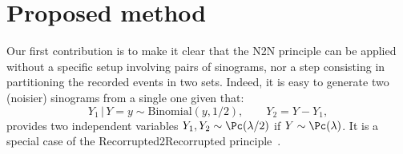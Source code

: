 \documentclass{IEEEtran}
\def\sym{^\text{sym}}
\def\ImDom{_\text{I}}
\def\CountDom{_\text{C}}
\def\CI{_\text{CI}}
\def\CountDomMC{_{\text{C-MC}}}
\def\ImDomMC{_{\text{I-MC}}}
\newcommand{\JI}[1]{{\color{darkgreen}{#1}}\xspace}
\begin{document}

\section{Proposed method}

Our first contribution is to make it clear that the N2N principle can be applied without a specific setup involving pairs of sinograms, nor a step consisting in partitioning the recorded events in two sets. Indeed, it is easy to generate two (noisier) sinograms from a single one given that:
\begin{equation*}
    Y_1 \,|\, Y=y \sim \text{Binomial}(y, 1/2),\qquad
    Y_2 = Y - Y_1,
\end{equation*}
provides two independent variables $Y_1,Y_2 \sim \Pc(\lambda/2)$ if $Y \sim \Pc(\lambda)$.
It is a special case of the Recorrupted2Recorrupted principle~\cite{Monroy24}. 
\end{document}

